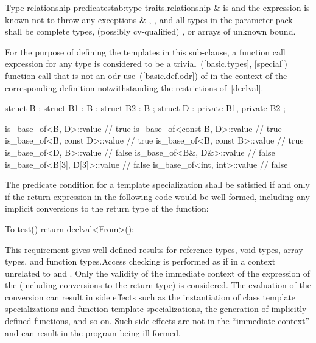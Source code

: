 \begin{libreqtab3f}{Type relationship predicates}{tab:type-traits.relationship}
\br
               &
  is  and
 the expression 
 is known not to throw any exceptions                                 &
 , , and all types in the parameter pack 
 shall be complete types, (possibly cv-qualified) , or
 arrays of unknown bound.                                             \\
\end{libreqtab3f}

\pnum
For the purpose of defining the templates in this sub-clause,
a function call expression  for any type 
is considered to be a trivial~(\ref{basic.types}, \ref{special}) function call
that is not an odr-use~(\ref{basic.def.odr}) of 
in the context of the corresponding definition
notwithstanding the restrictions of~\ref{declval}.

\pnum
\enterexample
\begin{codeblock}
struct B {};
struct B1 : B {};
struct B2 : B {};
struct D : private B1, private B2 {};

is_base_of<B, D>::value         // true
is_base_of<const B, D>::value   // true
is_base_of<B, const D>::value   // true
is_base_of<B, const B>::value   // true
is_base_of<D, B>::value         // false
is_base_of<B&, D&>::value       // false
is_base_of<B[3], D[3]>::value   // false
is_base_of<int, int>::value     // false
\end{codeblock}
\exitexample

\pnum
The predicate condition for a template specialization 
shall be satisfied if and only if the return expression in the following code would be
well-formed, including any implicit conversions to the return type of the function:

\begin{codeblock}
To test() {
  return declval<From>();
}
\end{codeblock}

\enternote This requirement gives well defined results for reference types, void
types, array types, and function types.\exitnote Access checking is performed as
if in a context unrelated to  and . Only the validity of
the immediate context of the expression of the 
(including conversions to the return type) is considered. \enternote The
evaluation of the conversion can result in side effects such as the
instantiation of class template specializations and function template
specializations, the generation of implicitly-defined functions, and so on. Such
side effects are not in the ``immediate context'' and can result in the program
being ill-formed. \exitnote

